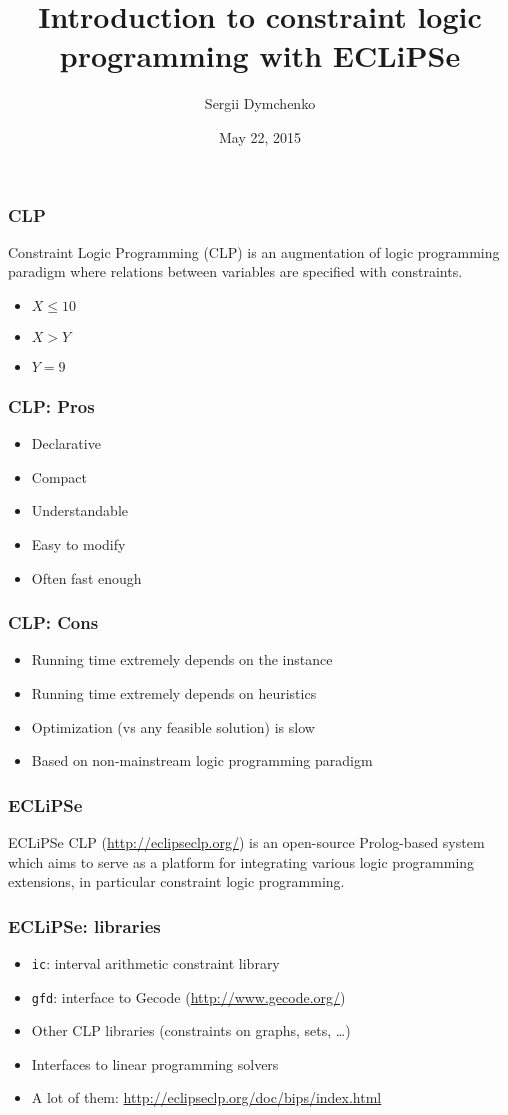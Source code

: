 \documentclass{beamer}
\title{Introduction to constraint logic programming with ECLiPSe}
\author{Sergii Dymchenko}
\institute{\url{http://sdymchenko.com}}
\date{May 22, 2015}
\begin{document}
\begin{frame}
\titlepage
\end{frame}

\begin{frame}
\frametitle{CLP}
Constraint Logic Programming (CLP) is an augmentation of logic programming paradigm where relations between variables are specified with constraints.
\begin{itemize}
\item $X \le 10$
\item $X > Y$
\item $Y = 9$
\end{itemize}
\end{frame}

\begin{frame}
\frametitle{CLP: Pros}
\begin{itemize}
\item Declarative
\item Compact
\item Understandable
\item Easy to modify
\item Often fast enough
\end{itemize}
\end{frame}

\begin{frame}
\frametitle{CLP: Cons}
\begin{itemize}
\item Running time extremely depends on the instance
\item Running time extremely depends on heuristics
\item Optimization (vs any feasible solution) is slow
\item Based on non-mainstream logic programming paradigm
\end{itemize}
\end{frame}

\begin{frame}
\frametitle{ECLiPSe}
ECLiPSe CLP (\url{http://eclipseclp.org/}) is an open-source Prolog-based system which
aims to serve as a platform for integrating various logic programming extensions, in particular constraint logic programming.
\end{frame}

\begin{frame}
\frametitle{ECLiPSe: libraries}
\begin{itemize}
\item \texttt{ic}: interval arithmetic constraint library
\item \texttt{gfd}: interface to Gecode (\url{http://www.gecode.org/})
\item Other CLP libraries (constraints on graphs, sets, \dots)
\item Interfaces to linear programming solvers
\item A lot of them: \url{http://eclipseclp.org/doc/bips/index.html}
\end{itemize}
\end{frame}
\end{document}
